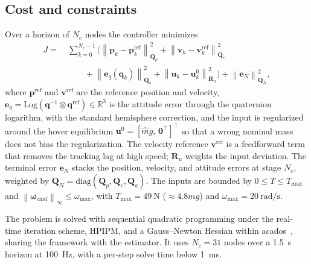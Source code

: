 \documentclass[lettersize,journal]{IEEEtran}
\newcommand{\R}{\mathbb{R}}
\newcommand{\norm}[1]{\left\| #1 \right\|}
\newcommand{\vect}[1]{\bm{#1}}
\newcommand{\mat}[1]{\mathbf{#1}}
\begin{document}
\subsection{Cost and constraints}
Over a horizon of $N_c$ nodes the controller minimizes
\begin{align}
J=\ &\sum_{k=0}^{N_c-1}\Big(
   \norm{\vect{p}_k-\vect{p}_k^{\text{ref}}}^2_{\mat{Q}_p}
  +\norm{\vect{v}_k-\vect{v}_k^{\text{ref}}}^2_{\mat{Q}_v}\nonumber\\
  &\qquad +\norm{\vect{e}_q(\vect{q}_k)}^2_{\mat{Q}_a}
  +\norm{\vect{u}_k-\vect{u}_k^0}^2_{\mat{R}_u}\Big)
  +\norm{\vect{e}_N}^2_{\mat{Q}_N},
\label{eq:nmpc-cost}
\end{align}
where $\vect{p}^{\text{ref}}$ and $\vect{v}^{\text{ref}}$ are the reference
position and velocity,
$\vect{e}_q=\mathrm{Log}(\vect{q}^{-1}\!\otimes\vect{q}^{\text{ref}})\in\R^3$ is
the attitude error through the quaternion logarithm, with the standard
hemisphere correction, and the input is regularized around the hover
equilibrium $\vect{u}^0=[\hat{m}g,\,\vect{0}^{\!\top}]^{\!\top}$ so that a wrong
nominal mass does not bias the regularization. The velocity reference
$\vect{v}^{\text{ref}}$ is a feedforward term that removes the tracking lag at
high speed; $\mat{R}_u$ weights the input deviation. The terminal error
$\vect{e}_N$ stacks the position, velocity, and attitude errors at stage $N_c$,
weighted by $\mat{Q}_N=\mathrm{diag}(\mat{Q}_p,\mat{Q}_v,\mat{Q}_a)$. The inputs
are bounded by
$0\leq T\leq T_{\max}$ and $\norm{\vect{\omega}_{\text{cmd}}}_\infty\leq\omega_{\max}$,
with $T_{\max}=\SI{49}{\newton}$ ($\approx4.8mg$) and
$\omega_{\max}=\SI{20}{\radian\per\second}$.

The problem is solved with sequential quadratic programming under the real-time
iteration scheme, HPIPM, and a Gauss--Newton Hessian within
acados~\cite{verschueren2022acados}, sharing the framework with the estimator. It
uses $N_c=31$ nodes over a \SI{1.5}{\second} horizon at \SI{100}{\hertz}, with a
per-step solve time below \SI{1}{\milli\second}.
\end{document}
